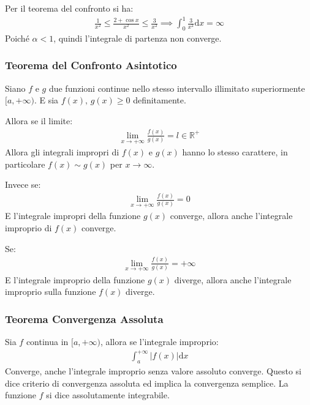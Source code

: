\documentclass{article}
\newcommand{\df}{\mathrm{d}}
\numberwithin{equation}{subsection}
\begin{document}
Per il teorema del confronto si ha:
\begin{gather*}
    \displaystyle\frac{1}{x^2}\leq\frac{2+\cos x}{x^2}\leq\frac{3}{x^2}\implies
    \displaystyle\int_0^{1}\frac{3}{x^2}\df x=\infty
\end{gather*}
Poiché $\alpha<1$, quindi l'integrale di partenza non converge. 

\subsubsection{Teorema del Confronto Asintotico}

Siano $f$ e $g$ due funzioni continue nello stesso intervallo illimitato superiormente $[a,+\infty)$. E sia $f(x),\,g(x)\geq0$ definitamente.

Allora se il limite:
\begin{gather*}
    \lim_{x\to+\infty}\displaystyle\frac{f(x)}{g(x)}=l\in\mathbb{R}^+
\end{gather*}
Allora gli integrali impropri di $f(x)$ e $g(x)$ hanno lo stesso carattere, in particolare $f(x)\sim g(x)$ per $x\to\infty$. 

Invece se:
\begin{gather*}
    \lim_{x\to+\infty}\displaystyle\frac{f(x)}{g(x)}=0
\end{gather*}
E l'integrale impropri della funzione $g(x)$ converge, allora anche l'integrale improprio di $f(x)$ converge. 


Se:
\begin{gather*}
    \lim_{x\to+\infty}\displaystyle\frac{f(x)}{g(x)}=+\infty
\end{gather*}
E l'integrale improprio della funzione $g(x)$ diverge, allora anche l'integrale improprio sulla funzione $f(x)$ diverge. 

\subsubsection{Teorema Convergenza Assoluta}

Sia $f$ continua in $[a,+\infty)$, allora se l'integrale improprio:
\begin{gather*}
    \displaystyle\int_a^{+\infty}|f(x)|\df x
\end{gather*}
Converge, anche l'integrale improprio senza valore assoluto converge. Questo si dice criterio di convergenza assoluta ed implica la convergenza semplice. La funzione $f$ si dice assolutamente integrabile. 

\end{document}
